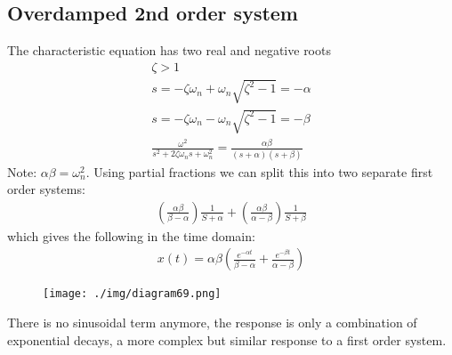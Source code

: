 \subsection{Overdamped 2nd order system}
The characteristic equation has two real and negative roots
\begin{gather}
  \zeta > 1\\
  s = - \zeta \omega_n + \omega_n \sqrt{\zeta^2 - 1} = -\alpha\\
  s = - \zeta \omega_n - \omega_n \sqrt{\zeta^2 - 1} = -\beta\\
  \frac{\omega^2}{s^2 + 2\zeta\omega_n s+ \omega_n^2} = \frac{\alpha \beta}{(s+\alpha)(s+\beta)}
\end{gather}
Note: $\alpha \beta = \omega_n^2$. Using partial fractions we can split this into two separate first order systems:
\begin{align}
  \left(\frac{\alpha\beta}{\beta - \alpha}\right) \frac{1}{S + \alpha} + \left(\frac{\alpha\beta}{\alpha - \beta}\right)\frac{1}{S+\beta}
\end{align}
which gives the following in the time domain:
\begin{align}
  x(t) = \alpha \beta \left(\frac{e^{-\alpha t}}{\beta - \alpha} + \frac{e^{-\beta t}}{\alpha - \beta}\right)
\end{align}
\begin{figure}[H]
  \centering
  \texttt{[image: ./img/diagram69.png]}
\end{figure}
There is no sinusoidal term anymore, the response is only a combination of exponential decays, a more complex but similar response to a first order system.
